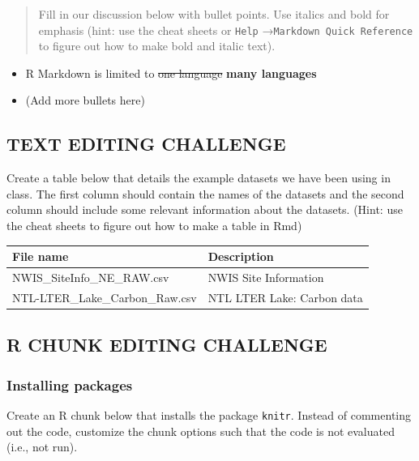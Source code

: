 \documentclass[
]{article}
\providecommand{\tightlist}{%
  \setlength{\itemsep}{0pt}\setlength{\parskip}{0pt}}
\begin{document}
\begin{quote}
Fill in our discussion below with bullet points. Use italics and bold
for emphasis (hint: use the cheat sheets or \texttt{Help}
→\texttt{Markdown\ Quick\ Reference} to figure out how to make bold and
italic text).
\end{quote}

\begin{itemize}
\tightlist
\item
  R Markdown is limited to \sout{one language} \textbf{many languages}
\item
  (Add more bullets here)
\end{itemize}

\hypertarget{text-editing-challenge}{%
\subsection{TEXT EDITING CHALLENGE}\label{text-editing-challenge}}

Create a table below that details the example datasets we have been
using in class. The first column should contain the names of the
datasets and the second column should include some relevant information
about the datasets. (Hint: use the cheat sheets to figure out how to
make a table in Rmd)

\begin{longtable}[]{@{}ll@{}}
\toprule()
File name & Description \\
\midrule()
\endhead
NWIS\_SiteInfo\_NE\_RAW.csv & NWIS Site Information \\
NTL-LTER\_Lake\_Carbon\_Raw.csv & NTL LTER Lake: Carbon data \\
\bottomrule()
\end{longtable}

\newpage

\hypertarget{r-chunk-editing-challenge}{%
\subsection{R CHUNK EDITING CHALLENGE}\label{r-chunk-editing-challenge}}

\hypertarget{installing-packages}{%
\subsubsection{Installing packages}\label{installing-packages}}

Create an R chunk below that installs the package \texttt{knitr}.
Instead of commenting out the code, customize the chunk options such
that the code is not evaluated (i.e., not run).
\end{document}
